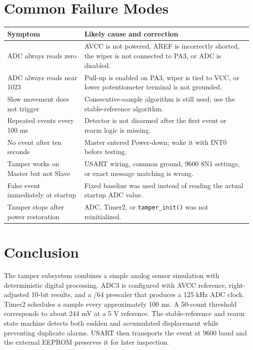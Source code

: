 \documentclass[11pt,a4paper]{article}
\begin{document}
\section{Common Failure Modes}
\begin{longtable}{p{}p{}}
\toprule
Symptom & Likely cause and correction \\
\midrule
\endhead
ADC always reads zero & AVCC is not powered, AREF is incorrectly shorted, the wiper is not connected to PA3, or ADC is disabled. \\
ADC always reads near 1023 & Pull-up is enabled on PA3, wiper is tied to VCC, or lower potentiometer terminal is not grounded. \\
Slow movement does not trigger & Consecutive-sample algorithm is still used; use the stable-reference algorithm. \\
Repeated events every 100 ms & Detector is not disarmed after the first event or rearm logic is missing. \\
No event after ten seconds & Master entered Power-down; wake it with INT0 before testing. \\
Tamper works on Master but not Slave & USART wiring, common ground, 9600 8N1 settings, or exact message matching is wrong. \\
False event immediately at startup & Fixed baseline was used instead of reading the actual startup ADC value. \\
Tamper stops after power restoration & ADC, Timer2, or \texttt{tamper\_init()} was not reinitialized. \\
\bottomrule
\end{longtable}

\section{Conclusion}
The tamper subsystem combines a simple analog sensor simulation with deterministic digital processing. ADC3 is configured with AVCC reference, right-adjusted 10-bit results, and a /64 prescaler that produces a 125 kHz ADC clock. Timer2 schedules a sample every approximately 100 ms. A 50-count threshold corresponds to about 244 mV at a 5 V reference. The stable-reference and rearm state machine detects both sudden and accumulated displacement while preventing duplicate alarms. USART then transports the event at 9600 baud and the external EEPROM preserves it for later inspection.
\end{document}
